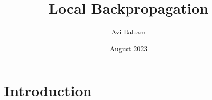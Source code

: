 \documentclass{article}
\title{Local Backpropagation}
\author{Avi  Balsam}
\date{August 2023}
\begin{document}
\maketitle

\section{Introduction}
\end{document}

